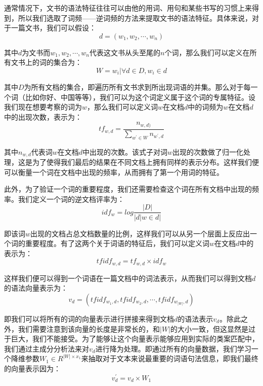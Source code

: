 通常情况下，文书的语法特征往往可以由他的用词、用句和某些书写的习惯上来得到，所以我们选取了词频——逆词频的方法来提取文书的语法特征。具体来说，对于一篇文书，我们可以假设：
	\begin{equation}
		d = (w_1,w_2,⋯,w_n)
	\end{equation}
	
其中$d$为文书而$w_1,w_2,⋯,w_n$代表这文书从头至尾的$n$个词，那么我们可以定义在所有文书上的词的集合为：
	\begin{equation}
		W = {w_i |\forall d∈D,w_i∈d}
	\end{equation}
	
其中$D$为所有文档的集合，即遍历所有文书求到所出现词语的并集。那么对于每一个词（比如你好、中国等等），我们可以为这个词定义属于这个词的专属特征。设我们现在想要考察的词为$w$，那么我们可以定义词$w$在文档$d$中的词频为$w$在文档$d$中的出现次数，表示为：
	\begin{equation}
		tf_{w,d} = \frac{n_{w,d)}}{\sum_{w^{'} \in W}n_{w^{'},d}}
	\end{equation}

其中$n_{w,d}$代表词$w$在文档$d$中出现的次数。该式子对词$w$出现的次数做了归一化处理，这是为了使得我们最后的结果在不同文档上拥有同样的表示分布。这样我们便可以衡量一个词在文档中出现的频率，从而拥有了第一个用词的特征。

此外，为了验证一个词的重要程度，我们还需要检查这个词在所有文档中出现的频率。我们定义一个词的逆文档评率为：
	\begin{equation}
		idf_{w}=log⁡ \frac{|D|}{|{d|w \in d}|}
	\end{equation}
	
即该词$w$出现的文档占总文档数量的比例，这样我们可以从另一个层面上反应出一个词的重要程度。有了这两个关于词语的特征后，我们可以定义词$w$在文档$d$中的表示为：
	\begin{equation}
		tfidf_{w,d} = tf_{w,d} \times idf_{w}
	\end{equation}
	
这样我们便可以得到一个词语在一篇文档中的词法表示，从而我们可以得到文档$d$的语法向量表示为：
	\begin{equation}
		v_{d}=(tfidf_{w_{1},d},tfidf_{w_{2},d},⋯,tfidf_{w_{|W|},d})
	\end{equation}
	
即我们可以将所有的词的向量表示进行拼接来得到文档$d$的语法表示$v_{d}$。除此之外，我们需要注意到该向量的长度是非常长的，和$|W|$的大小一致，但这显然是过于巨大，我们不能接受。为了能够让这个向量表示能够应用到实际的类案匹配中，我们通过主成分分析法来对$v_{d}$进行降为处理。即通过所有的向量数据，我们学习一个降维参数$W_{1} \in R^{|W| \times x_{1}}$来抽取对于文本来说最重要的词语句法信息，即我们最终的向量表示因为：
	\begin{equation}
		v_{d}^{'}=v_{d} \times W_{1}
	\end{equation}

